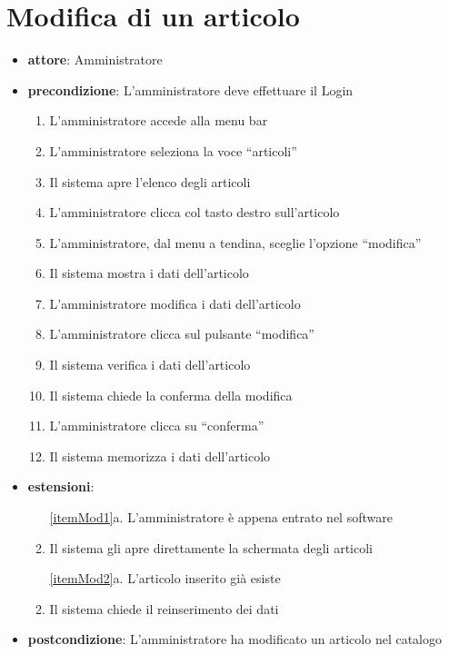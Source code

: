 \section{Modifica di un articolo}
\begin{itemize}
	\item \textbf{attore}: Amministratore
	\item \textbf{precondizione}: L’amministratore deve effettuare il Login

	\begin{enumerate}
		\item L’amministratore accede alla menu bar
		\label{itemMod1}
		\item L’amministratore seleziona la voce “articoli”
		\item Il sistema apre l’elenco degli articoli
		\item L’amministratore clicca col tasto destro sull’articolo
		\item L’amministratore, dal menu a tendina, sceglie l’opzione “modifica”
		\item Il sistema mostra i dati dell’articolo
		\item L’amministratore modifica i dati dell’articolo
		\item L’amministratore clicca sul pulsante “modifica”
		\label{itemMod2}
		\item Il sistema verifica i dati dell’articolo
		\item Il sistema chiede la conferma della modifica
		\item L’amministratore clicca su “conferma”
		\item Il sistema memorizza i dati dell’articolo
	\end{enumerate}

	\item \textbf{estensioni}:
	\begin{enumerate}
		\item[\ref{itemMod1}a.] L’amministratore è appena entrato nel software
		\item Il sistema gli apre direttamente la schermata degli articoli
	\end{enumerate}

	\begin{enumerate}
		\item[\ref{itemMod2}a.] L’articolo inserito già esiste
		\item Il sistema chiede il reinserimento dei dati
	\end{enumerate}

	\item \textbf{postcondizione}: L’amministratore ha modificato un articolo nel catalogo
\end{itemize}


